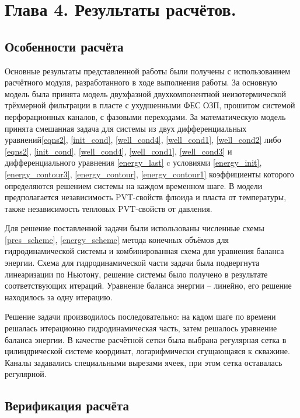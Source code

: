 \section*{Глава 4. Результаты расчётов.}
\setcounter{section}{4}
\setcounter{subsection}{0}
\setcounter{equation}{0}

\subsection{Особенности расчёта}

	Основные результаты представленной работы были получены с использованием расчётного модуля, разработанного в ходе выполнения работы. За основную модель была принята модель двухфазной двухкомпонентной неизотермической трёхмерной фильтрации в пласте с ухудшенными ФЕС ОЗП, прошитом системой перфорационных каналов, с фазовыми переходами. За математическую модель принята смешанная задача для системы из двух дифференциальных уравнений\eqref{eqns2}, \eqref{init_cond}, \eqref{well_cond4}, \eqref{well_cond1}, \eqref{well_cond2} либо \eqref{eqns2}, 		\eqref{init_cond}, \eqref{well_cond4}, \eqref{well_cond1}, \eqref{well_cond3} и дифференциального уравнения \eqref{energy_last} c условиями \eqref{energy_init}, \eqref{energy_contour3}, \eqref{energy_contour}, \eqref{energy_contour1} коэффициенты которого определяются решением системы на каждом временном шаге.
	В модели предполагается независимость PVT-свойств флюида и пласта от температуры, также независимость тепловых PVT-свойств от давления.

	Для решение поставленной задачи были использованы численные схемы \eqref{pres_scheme}, \eqref{energy_scheme} метода конечных объёмов для гидродинамической системы и комбинированная схема для уравнения баланса энергии.
	Схема для гидродинамической части задачи была подвергнута линеаризации по Ньютону, решение системы было получено в результате соответствующих итераций.
	Уравнение баланса энергии -- линейно, его решение находилось за одну итерацию.

	Решение задачи производилось последовательно: на кадом шаге по времени решалась итерационно гидродинамическая часть, затем решалось уравнение баланса энергии. В качестве расчётной сетки была выбрана регулярная сетка в цилиндрической системе координат, логарифмически сгущающаяся к скважине.
	Каналы задавались специальными вырезами ячеек, при этом сетка оставалась регулярной.

\subsection{Верификация расчёта}

